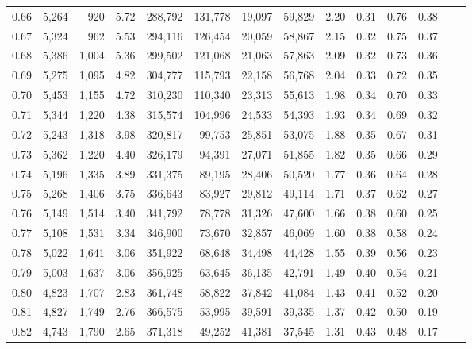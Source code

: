 \begin{tabular}{rrrrrrrrrrrrrr}
0.66 &  5,264 &    920 &    5.72 &  288,792 &  131,778 &  19,097 &  59,829 &  2.20 &  0.31 &  0.76 &      0.38 \\
0.67 &  5,324 &    962 &    5.53 &  294,116 &  126,454 &  20,059 &  58,867 &  2.15 &  0.32 &  0.75 &      0.37 \\
0.68 &  5,386 &  1,004 &    5.36 &  299,502 &  121,068 &  21,063 &  57,863 &  2.09 &  0.32 &  0.73 &      0.36 \\
0.69 &  5,275 &  1,095 &    4.82 &  304,777 &  115,793 &  22,158 &  56,768 &  2.04 &  0.33 &  0.72 &      0.35 \\
0.70 &  5,453 &  1,155 &    4.72 &  310,230 &  110,340 &  23,313 &  55,613 &  1.98 &  0.34 &  0.70 &      0.33 \\
0.71 &  5,344 &  1,220 &    4.38 &  315,574 &  104,996 &  24,533 &  54,393 &  1.93 &  0.34 &  0.69 &      0.32 \\
0.72 &  5,243 &  1,318 &    3.98 &  320,817 &   99,753 &  25,851 &  53,075 &  1.88 &  0.35 &  0.67 &      0.31 \\
0.73 &  5,362 &  1,220 &    4.40 &  326,179 &   94,391 &  27,071 &  51,855 &  1.82 &  0.35 &  0.66 &      0.29 \\
0.74 &  5,196 &  1,335 &    3.89 &  331,375 &   89,195 &  28,406 &  50,520 &  1.77 &  0.36 &  0.64 &      0.28 \\
0.75 &  5,268 &  1,406 &    3.75 &  336,643 &   83,927 &  29,812 &  49,114 &  1.71 &  0.37 &  0.62 &      0.27 \\
0.76 &  5,149 &  1,514 &    3.40 &  341,792 &   78,778 &  31,326 &  47,600 &  1.66 &  0.38 &  0.60 &      0.25 \\
0.77 &  5,108 &  1,531 &    3.34 &  346,900 &   73,670 &  32,857 &  46,069 &  1.60 &  0.38 &  0.58 &      0.24 \\
0.78 &  5,022 &  1,641 &    3.06 &  351,922 &   68,648 &  34,498 &  44,428 &  1.55 &  0.39 &  0.56 &      0.23 \\
0.79 &  5,003 &  1,637 &    3.06 &  356,925 &   63,645 &  36,135 &  42,791 &  1.49 &  0.40 &  0.54 &      0.21 \\
0.80 &  4,823 &  1,707 &    2.83 &  361,748 &   58,822 &  37,842 &  41,084 &  1.43 &  0.41 &  0.52 &      0.20 \\
0.81 &  4,827 &  1,749 &    2.76 &  366,575 &   53,995 &  39,591 &  39,335 &  1.37 &  0.42 &  0.50 &      0.19 \\
0.82 &  4,743 &  1,790 &    2.65 &  371,318 &   49,252 &  41,381 &  37,545 &  1.31 &  0.43 &  0.48 &      0.17 \\

\end{tabular}
